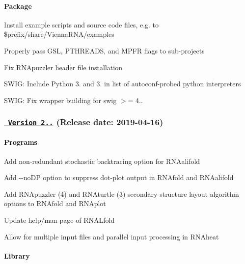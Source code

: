 \paragraph*{Package}


\begin{DoxyItemize}
\item Install example scripts and source code files, e.\+g. to \$prefix/share/\+Vienna\+R\+N\+A/examples
\item Properly pass G\+SL, P\+T\+H\+R\+E\+A\+DS, and M\+P\+FR flags to sub-\/projects
\item Fix {\ttfamily R\+N\+Apuzzler} header file installation
\item S\+W\+IG\+: Include Python 3. and 3. in list of autoconf-\/probed python interpreters
\item S\+W\+IG\+: Fix wrapper building for {\ttfamily swig $>$= 4..}
\end{DoxyItemize}

\subsubsection*{\href{https://github.com/ViennaRNA/ViennaRNA/compare/v2.4.11...v2.4.12}{\texttt{ Version 2..}} (Release date\+: 2019-\/04-\/16)}

\paragraph*{Programs}


\begin{DoxyItemize}
\item Add non-\/redundant stochastic backtracing option for {\ttfamily R\+N\+Aalifold}
\item Add {\ttfamily -\/-\/no\+DP} option to suppress dot-\/plot output in {\ttfamily R\+N\+Afold} and {\ttfamily R\+N\+Aalifold}
\item Add {\ttfamily R\+N\+Apuzzler} (4) and {\ttfamily R\+N\+Aturtle} (3) secondary structure layout algorithm options to {\ttfamily R\+N\+Afold} and {\ttfamily R\+N\+Aplot}
\item Update help/man page of {\ttfamily R\+N\+A\+Lfold}
\item Allow for multiple input files and parallel input processing in {\ttfamily R\+N\+Aheat}
\end{DoxyItemize}

\paragraph*{Library}


